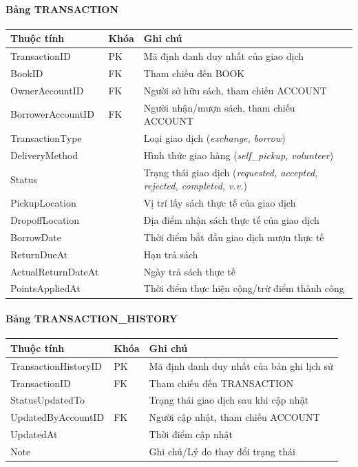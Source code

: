 \paragraph{Bảng TRANSACTION}
{\small
\begin{longtable}{L{0.28\textwidth}L{0.12\textwidth}L{0.52\textwidth}}
\toprule
\textbf{Thuộc tính} & \textbf{Khóa} & \textbf{Ghi chú} \\
\midrule
TransactionID & PK & Mã định danh duy nhất của giao dịch \\
BookID & FK & Tham chiếu đến BOOK \\
OwnerAccountID & FK & Người sở hữu sách, tham chiếu ACCOUNT \\
BorrowerAccountID & FK & Người nhận/mượn sách, tham chiếu ACCOUNT \\
TransactionType & & Loại giao dịch (\textit{exchange, borrow}) \\
DeliveryMethod & & Hình thức giao hàng (\textit{self\_pickup, volunteer}) \\
Status & & Trạng thái giao dịch (\textit{requested, accepted, rejected, completed, v.v.}) \\
PickupLocation & & Vị trí lấy sách thực tế của giao dịch \\
DropoffLocation & & Địa điểm nhận sách thực tế của giao dịch \\
BorrowDate & & Thời điểm bắt đầu giao dịch mượn thực tế \\
ReturnDueAt & & Hạn trả sách \\
ActualReturnDateAt & & Ngày trả sách thực tế \\
PointsAppliedAt & & Thời điểm thực hiện cộng/trừ điểm thành công \\
\bottomrule
\end{longtable}
}

\paragraph{Bảng TRANSACTION\_HISTORY}
{\small
\begin{longtable}{L{0.28\textwidth}L{0.12\textwidth}L{0.52\textwidth}}
\toprule
\textbf{Thuộc tính} & \textbf{Khóa} & \textbf{Ghi chú} \\
\midrule
TransactionHistoryID & PK & Mã định danh duy nhất của bản ghi lịch sử \\
TransactionID & FK & Tham chiếu đến TRANSACTION \\
StatusUpdatedTo & & Trạng thái giao dịch sau khi cập nhật \\
UpdatedByAccountID & FK & Người cập nhật, tham chiếu ACCOUNT \\
UpdatedAt & & Thời điểm cập nhật \\
Note & & Ghi chú/Lý do thay đổi trạng thái \\
\bottomrule
\end{longtable}
}

